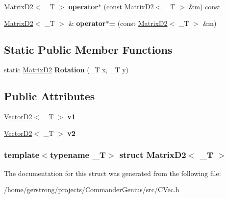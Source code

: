 \begin{DoxyCompactItemize}
\item 
\hypertarget{struct_matrix_d2_ae9ee9cf474153155c7e0f518f2d3a73c}{
\hyperlink{struct_matrix_d2}{MatrixD2}$<$ \_\-T $>$ {\bfseries operator$\ast$} (const \hyperlink{struct_matrix_d2}{MatrixD2}$<$ \_\-T $>$ \&m) const }
\label{struct_matrix_d2_ae9ee9cf474153155c7e0f518f2d3a73c}

\item 
\hypertarget{struct_matrix_d2_ad4495f392b19dec4082691dc14a9c09b}{
\hyperlink{struct_matrix_d2}{MatrixD2}$<$ \_\-T $>$ \& {\bfseries operator$\ast$=} (const \hyperlink{struct_matrix_d2}{MatrixD2}$<$ \_\-T $>$ \&m)}
\label{struct_matrix_d2_ad4495f392b19dec4082691dc14a9c09b}

\end{DoxyCompactItemize}
\subsection*{Static Public Member Functions}
\begin{DoxyCompactItemize}
\item 
\hypertarget{struct_matrix_d2_a17f8017e2bc9f80c4f57f2b46ca5e475}{
static \hyperlink{struct_matrix_d2}{MatrixD2} {\bfseries Rotation} (\_\-T x, \_\-T y)}
\label{struct_matrix_d2_a17f8017e2bc9f80c4f57f2b46ca5e475}

\end{DoxyCompactItemize}
\subsection*{Public Attributes}
\begin{DoxyCompactItemize}
\item 
\hypertarget{struct_matrix_d2_a1e9bc160b703351e9391a546a2fb1c97}{
\hyperlink{struct_vector_d2}{VectorD2}$<$ \_\-T $>$ {\bfseries v1}}
\label{struct_matrix_d2_a1e9bc160b703351e9391a546a2fb1c97}

\item 
\hypertarget{struct_matrix_d2_aedec60b929618c810fc0af9d9246763d}{
\hyperlink{struct_vector_d2}{VectorD2}$<$ \_\-T $>$ {\bfseries v2}}
\label{struct_matrix_d2_aedec60b929618c810fc0af9d9246763d}

\end{DoxyCompactItemize}
\subsubsection*{template$<$typename \_\-T$>$ struct MatrixD2$<$ \_\-T $>$}



The documentation for this struct was generated from the following file:\begin{DoxyCompactItemize}
\item 
/home/gerstrong/projects/CommanderGenius/src/CVec.h\end{DoxyCompactItemize}
